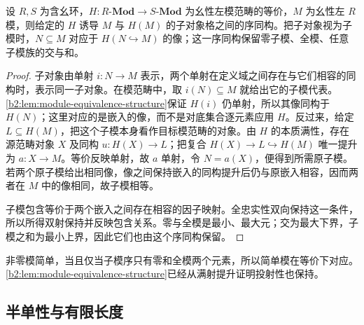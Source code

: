 \begin{proposition}\label{b2:prop:morita-submodule-lattices}
	设 \(R,S\) 为含幺环，\(H:R\text{-}\mathbf{Mod}\rightarrow S\text{-}\mathbf{Mod}\) 为幺性左模范畴的等价，\(M\) 为幺性左 \(R\) 模，则给定的 \(H\) 诱导 \(M\) 与 \(H(M)\) 的子对象格之间的序同构。把子对象视为子模时，\(N\subseteq M\) 对应于 \(H(N\hookrightarrow M)\) 的像；这一序同构保留零子模、全模、任意子模族的交与和。
\end{proposition}
\begin{proof}
	子对象由单射 \(i:N\to M\) 表示，两个单射在定义域之间存在与它们相容的同构时，表示同一子对象。在模范畴中，取 \(i(N)\subseteq M\) 就给出它的子模代表。\cref{b2:lem:module-equivalence-structure}保证 \(H(i)\) 仍单射，所以其像同构于 \(H(N)\)；这里对应的是嵌入的像，而不是对底集合逐元素应用 \(H\)。反过来，给定 \(L\subseteq H(M)\)，把这个子模本身看作目标模范畴的对象。由 \(H\) 的本质满性，存在源范畴对象 \(X\) 及同构 \(u:H(X)\rightarrow L\)；把复合 \(H(X)\rightarrow L\hookrightarrow H(M)\) 唯一提升为 \(a:X\rightarrow M\)。等价反映单射，故 \(a\) 单射，令 \(N=a(X)\)，便得到所需原子模。若两个原子模给出相同像，像之间保持嵌入的同构提升后仍与原嵌入相容，因而两者在 \(M\) 中的像相同，故子模相等。

	子模包含等价于两个嵌入之间存在相容的因子映射。全忠实性双向保持这一条件，所以所得双射保持并反映包含关系。零与全模是最小、最大元；交为最大下界，子模之和为最小上界，因此它们也由这个序同构保留。
\end{proof}

非零模简单，当且仅当子模序只有零和全模两个元素，所以简单模在等价下对应。\cref{b2:lem:module-equivalence-structure}已经从满射提升证明投射性也保持。

\subsection{半单性与有限长度}
\label{b2:subsec:1604:02}

